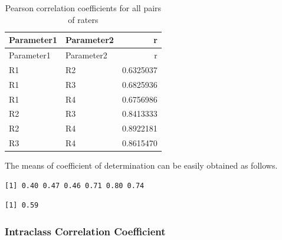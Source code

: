 \documentclass[
  letterpaper,
  DIV=11,
  numbers=noendperiod]{scrreprt}
\newenvironment{Shaded}{\begin{snugshade}}{\end{snugshade}}
\newcommand{\CommentTok}[1]{\textcolor[rgb]{0.37,0.37,0.37}{#1}}
\newcommand{\DecValTok}[1]{\textcolor[rgb]{0.68,0.00,0.00}{#1}}
\newcommand{\FunctionTok}[1]{\textcolor[rgb]{0.28,0.35,0.67}{#1}}
\newcommand{\NormalTok}[1]{\textcolor[rgb]{0.00,0.23,0.31}{#1}}
\newcommand{\SpecialCharTok}[1]{\textcolor[rgb]{0.37,0.37,0.37}{#1}}
\begin{document}
\hypertarget{tbl-correl}{}
\begin{longtable}[]{@{}llr@{}}
\caption{\label{tbl-correl}Pearson correlation coefficients for all
pairs of raters}\tabularnewline
\toprule\noalign{}
Parameter1 & Parameter2 & r \\
\midrule\noalign{}
\endfirsthead
\toprule\noalign{}
Parameter1 & Parameter2 & r \\
\midrule\noalign{}
\endhead
\bottomrule\noalign{}
\endlastfoot
R1 & R2 & 0.6325037 \\
R1 & R3 & 0.6825936 \\
R1 & R4 & 0.6756986 \\
R2 & R3 & 0.8413333 \\
R2 & R4 & 0.8922181 \\
R3 & R4 & 0.8615470 \\
\end{longtable}

The means of coefficient of determination can be easily obtained as
follows.

\begin{Shaded}
\end{Shaded}

\begin{verbatim}
[1] 0.40 0.47 0.46 0.71 0.80 0.74
\end{verbatim}

\begin{Shaded}
\end{Shaded}

\begin{verbatim}
[1] 0.59
\end{verbatim}

\hypertarget{intraclass-correlation-coefficient}{%
\subsubsection{Intraclass Correlation
Coefficient}\label{intraclass-correlation-coefficient}}
\end{document}

